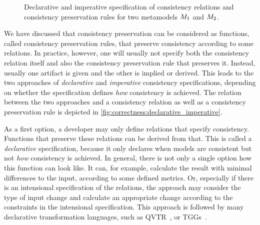 \begin{figure}
    \centering
    
    \caption[Declarative and imperative consistency specification]{Declarative and imperative specification of consistency relations and consistency preservation rules for two metamodels $\metamodel{M}{1}$ and $\metamodel{M}{2}$.}
    \label{fig:correctness:declarative_imperative}
\end{figure}

We have discussed that consistency preservation can be considered as functions, called consistency preservation rules, that preserve consistency according to some relations.
In practice, however, one will usually not specify both the consistency relation itself and also the consistency preservation rule that preserves it.
Instead, usually one artifact is given and the other is implied or derived.
This leads to the two approaches of \emph{declarative} and \emph{imperative} consistency specifications, depending on whether the specification defines \emph{how} consistency is achieved.
The relation between the two approaches and a consistency relation as well as a consistency preservation rule is depicted in \autoref{fig:correctness:declarative_imperative}.

As a first option, a developer may only define relations that specify consistency. Functions that preserve these relations can be derived from that.
This is called a \emph{declarative} specification, because it only declares when models are consistent but not \emph{how} consistency is achieved.
In general, there is not only a single option how this function can look like.
It can, for example, calculate the result with minimal differences to the input, according to some defined metrics.
Or, especially if there is an intensional specification of the relations, the approach may consider the type of input change and calculate an appropriate change according to the constraints in the intensional specification.
This approach is followed by many declarative transformation languages, such as \gls{QVTR}~\cite{qvt}, or \glspl{TGG}~\cite{anjorin2014EfficientSynchronizationTGG-ECMFA}.

